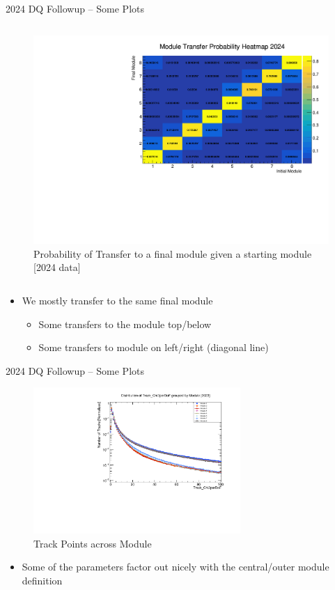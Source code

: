 \begin{frame}{2024 DQ Followup -- Some Plots}
\begin{columns}
\begin{column}{0.5\linewidth}
\begin{figure}
                \includegraphics[width=\linewidth]{assets/st0_module_number vs st1_module_number_prob_2024.pdf}
                \caption{Probability of Transfer to a final module given a starting module [2024 data]}
            \end{figure}
        \end{column}
    \end{columns}
    \begin{itemize}
        \item We mostly transfer to the same final module 
        \begin{itemize}
            \item Some transfers to the module  top/below
            \item Some transfers to module on left/right (diagonal line)
        \end{itemize}
    \end{itemize}
\end{frame}


\begin{frame}{2024 DQ Followup -- Some Plots}
    \begin{figure}
        \centering
        \includegraphics[width=0.7\textwidth]{assets/Track_Chi2perDoF_st0_2023.pdf}
        \caption{Track Points across Module}
    \end{figure}
    \begin{itemize}
        \item Some of the parameters factor out nicely with the central/outer module definition
    \end{itemize}
\end{frame}
